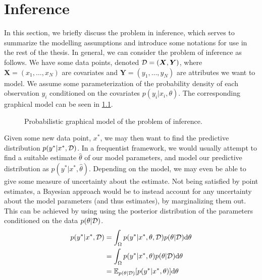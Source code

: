 \chapter{Inference}

In this section, we briefly discuss the problem in inference, which serves to summarize the modelling assumptions and introduce some notations for use in the rest of the thesis. 
In general, we can consider the problem of inference as follows. We have some data points, denoted $\mathcal{D} = (\bm{X}, \bm{Y})$, where $\bm{X} = (x_1,\dots,x_N)$ are covariates and $\bm{Y} = (y_1, \dots, y_N)$ are attributes we want to model. 
We assume some parameterization of the probability density of each observation $y_i$ conditioned on the covariates $p(y_i|x_i,\theta)$.
The corresponding graphical model can be seen in \cref{fig:pgm}. 
\begin{figure}[htbp]
    \centering
    \caption{Probabilistic graphical model of the problem of inference.}
    \label{fig:pgm}
\end{figure}
Given some new data point, $x^\ast$, we may then want to find the predictive distribution $p(y^\ast | x^\ast, \mathcal{D})$. 
In a frequentist framework, we would usually attempt to find a suitable estimate $\hat{\theta}$ of our model parameters, and model our predictive distribution as $p(y^\ast | x^\ast, \hat{\theta})$. Depending on the model, we may even be able to give some measure of uncertainty about the estimate. Not being satisfied by point estimates, a Bayesian approach would be to instead account for any uncertainty about the model parameters (and thus estimates), by marginalizing them out. 
This can be achieved by using using the posterior distribution of the parameters conditioned on the data $p(\theta|\mathcal{D})$.
\begin{equation}\label{eq:inference}
    \begin{aligned}
        p(y^\ast | x^\ast, \mathcal{D}) &= \int_{\Omega} p(y^\ast | x^\ast, \theta, \mathcal{D})  p(\theta|\mathcal{D}) \dd\theta \\
        &= \int_{\Omega} p(y^\ast | x^\ast, \theta)  p(\theta|\mathcal{D}) \dd\theta\\
        &= \operatorname{\mathbb{E}}_{p(\theta|\mathcal{D})} [p(y^\ast | x^\ast, \theta)]  \dd\theta
    \end{aligned}
\end{equation}
